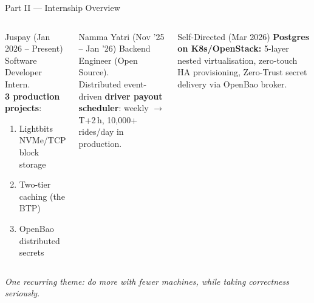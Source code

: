 \documentclass[aspectratio=169,xcolor=dvipsnames,9pt]{beamer}
\begin{document}
\begin{frame}{Part II --- Internship Overview}
\begin{columns}[T]
  \begin{block}{Juspay (Jan 2026 -- Present)}
    \footnotesize
    Software Developer Intern.\\
    \textbf{3 production projects}:
    \begin{enumerate}
      \item Lightbits NVMe/TCP block storage
      \item Two-tier caching (the BTP)
      \item OpenBao distributed secrets
    \end{enumerate}
  \end{block}
  \begin{exampleblock}{Namma Yatri (Nov '25 -- Jan '26)}
    \footnotesize
    Backend Engineer (Open Source).\\
    Distributed event-driven \textbf{driver payout scheduler}: weekly $\to$ T+2\,h, 10{,}000+ rides/day in production.
  \end{exampleblock}
  \begin{alertblock}{Self-Directed (Mar 2026)}
    \footnotesize
    \textbf{Postgres on K8s/OpenStack:} 5-layer nested virtualisation, zero-touch HA provisioning, Zero-Trust secret delivery via OpenBao broker.
  \end{alertblock}
\end{columns}
\vspace{0.4em}
\centering
\footnotesize
\textit{One recurring theme:} \emph{do more with fewer machines, while taking correctness seriously}.
\end{frame}
\end{document}
